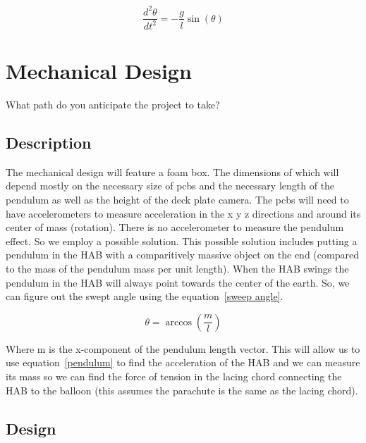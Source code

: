 \documentclass[journal]{SPEXformat}
\newenvironment{help}{
  \ttfamily\footnotesize\sloppy
  \begin{lrbox}{\helpbox}\begin{minipage}{\linewidth}
  }{
  \end{minipage}\end{lrbox}
  \ifbool{showhelp}{
    \fbox{\usebox{\helpbox}}
  }{}
}
\begin{document}
  \begin{equation} \label{pendulum}
  \frac{d^2\theta}{dt^2} = -\frac{g}{l}\sin(\theta)
  \end{equation}

\section{Mechanical Design}
\label{sec:mechanical design}
\begin{help}
  What path do you anticipate the project to take?
\end{help}

\subsection{Description}
\label{subsec: description}
  The mechanical design will feature a foam box. The dimensions of which will depend mostly on the necessary size of
  pcbs and the necessary length of the pendulum as well as the height of the deck plate camera. The pcbs will need to
  have accelerometers to measure acceleration in the x y z directions and around its center of mass (rotation). There
  is no accelerometer to measure the pendulum effect. So we employ a possible solution. This possible solution includes
  putting a pendulum in the HAB with a comparitively massive object on the end (compared to the mass of the pendulum
  mass per unit length). When the HAB swings the pendulum in the HAB will always point towards the center of the earth.
  So, we can figure out the swept angle using the equation~\ref{sweep angle}.

  \begin{equation} \label{sweep angle}
  \theta = \arccos(\frac{m}{l})
  \end{equation}

  Where m is the x-component of the pendulum length vector. This will allow us to use equation~\ref{pendulum} to find
  the acceleration of the HAB and we can measure its mass so we can find the force of tension in the lacing chord
  connecting the HAB to the balloon (this assumes the parachute is the same as the lacing chord).

\subsection{Design}
\label{subsec: design}
\end{document}
